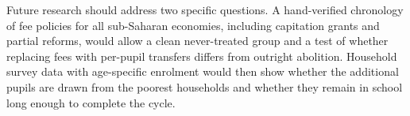 \documentclass[12pt]{article}
\begin{document}
Future research should address two specific questions. A hand-verified chronology of fee policies for all sub-Saharan economies, including capitation grants and partial reforms, would allow a clean never-treated group and a test of whether replacing fees with per-pupil transfers differs from outright abolition. Household survey data with age-specific enrolment would then show whether the additional pupils are drawn from the poorest households and whether they remain in school long enough to complete the cycle.



\end{document}
